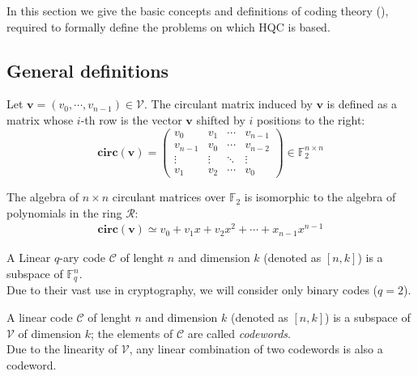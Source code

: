 In this section we give the basic concepts and definitions of coding theory (\cite{macwilliams1977theory}), required to formally define
the problems on which HQC is based.

\subsection{General definitions}
\begin{definition}
    Let $\mathbf{v} = (v_0, \cdots, v_{n-1}) \in \mathcal{V}$. The circulant matrix induced by $\mathbf{v}$ is defined as
    a matrix whose $i$-th row is the vector $\mathbf{v}$ shifted by $i$ positions to the right:
    \begin{equation*}
        \mathbf{circ(v)} = \begin{pmatrix}
            v_0 & v_1 & \cdots & v_{n-1} \\
            v_{n-1} & v_0 & \cdots & v_{n-2} \\
            \vdots & \vdots & \ddots & \vdots \\
            v_1 & v_2 & \cdots & v_0
            \end{pmatrix} \in \mathds{F}_2^{n\times n}
    \end{equation*}
\end{definition}
The algebra of $n\times n$ circulant matrices over $\mathds{F}_2$ is isomorphic to the algebra of polynomials
in the ring $\mathcal{R}$:
\begin{align*}
    \mathbf{circ(v)} \simeq v_0 + v_1x + v_2x^2 + \cdots + x_{n-1}x^{n-1} 
\end{align*}

\begin{definition}
    A Linear $q$-ary code $\mathcal{C}$ of lenght $n$ and dimension $k$ (denoted as $[n, k]$) is a subspace of $\mathds{F}_q^n$.\\
    Due to their vast use in cryptography, we will consider only binary codes ($q=2$).
\end{definition}

\begin{definition}
    A linear code $\mathcal{C}$ of lenght $n$ and dimension $k$ (denoted as $[n, k]$) is a subspace of $\mathcal{V}$ 
    of dimension $k$; the elements of $\mathcal{C}$ are called \textit{codewords}.\\
    Due to the linearity of $\mathcal{V}$, any linear combination of two codewords is also a codeword.
\end{definition}

